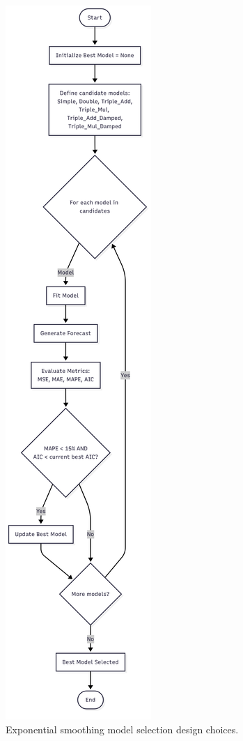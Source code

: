 \begin{figure}[h]
	\centering
	\includegraphics[scale=0.18]{"Chapters/images/exponentialsmoothingmodel.png"}
	\caption{Exponential smoothing model selection design choices.}
	\label{fig:exponential-smoothing-model-choice}
\end{figure}

